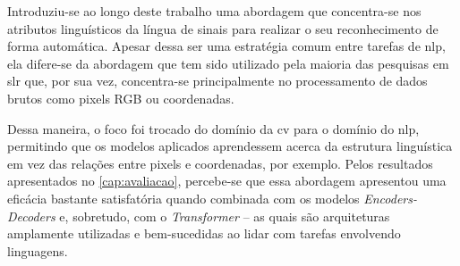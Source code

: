 Introduziu-se ao longo deste trabalho uma abordagem que concentra-se nos atributos linguísticos da língua de sinais para realizar o seu reconhecimento de forma automática.
Apesar dessa ser uma estratégia comum entre tarefas de \acrfull{nlp}, ela difere-se da abordagem que tem sido utilizado pela maioria das pesquisas em \acrfull{slr} que, por sua vez, concentra-se principalmente no processamento de dados brutos como pixels RGB ou coordenadas.

Dessa maneira, o foco foi trocado do domínio da \acrfull{cv} para o domínio do \acrshort{nlp}, permitindo que os modelos aplicados aprendessem acerca da estrutura linguística em vez das relações entre pixels e coordenadas, por exemplo.
Pelos resultados apresentados no \autoref{cap:avaliacao}, percebe-se que essa abordagem apresentou uma eficácia bastante satisfatória quando combinada com os modelos \textit{Encoders-Decoders} e, sobretudo, com o \textit{Transformer} -- as quais são arquiteturas amplamente utilizadas e bem-sucedidas ao lidar com tarefas envolvendo linguagens.
